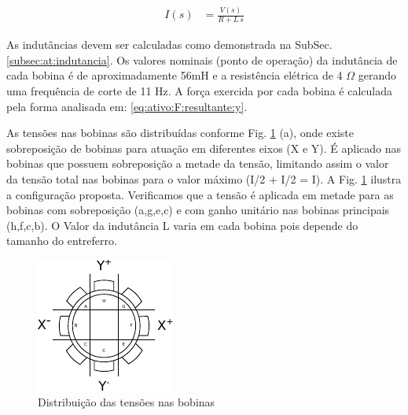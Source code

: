 \begin{align}
	I(s) &= \frac{V(s)}{R + L \, s} 
\end{align}

As indutâncias devem ser calculadas como demonstrada na SubSec. \ref{subsec:at:indutancia}. Os valores nominais (ponto de operação) da indutância de cada bobina é de aproximadamente 56mH e a resistência elétrica de 4 $\Omega$ gerando uma frequência de corte de 11 Hz. A força exercida por cada bobina é calculada pela forma analisada em: \eqref{eq:ativo:F:resultante:y}.


As tensões nas bobinas são distribuídas conforme Fig. \ref{fig:blocos:tensao:bobinas:x:y} (a), onde existe sobreposição de bobinas para atuação em diferentes eixos (X e Y). É aplicado nas bobinas que possuem sobreposição a metade da tensão, limitando assim o valor da tensão total nas bobinas para o valor máximo (I/2 + I/2 = I). A Fig. \ref{fig:blocos:tensao:bobinas:x:y} ilustra a configuração proposta. Verificamos que a tensão é aplicada em metade para as bobinas com sobreposição (a,g,e,c) e com ganho unitário nas bobinas principais (h,f,c,b). O Valor da indutância L varia em cada bobina pois depende do tamanho do entreferro.


\begin{figure}[th]
\centering
\includegraphics[width=0.5\linewidth]{./Figs/Modelagem/ativo-atuadores-conexao}
%
\caption{Distribuição das tensões nas bobinas}
\label{fig:blocos:tensao:bobinas:x:y}
\end{figure}

